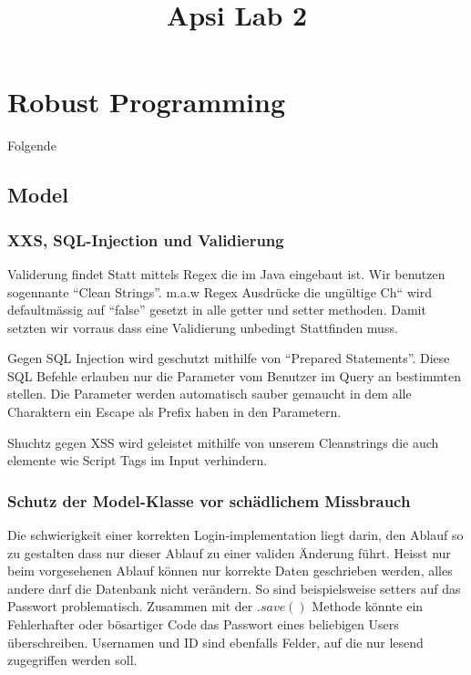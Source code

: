 \documentclass[10pt]{scrartcl}
\title{ %
Apsi
\vspace{0.2cm}
\Large Lab 2 }
\begin{document}
 \maketitle
 \thispagestyle{firststyle}
 \pagestyle{firststyle}
 \begin{abstract}
 \begin{center}

 \end{center}
 \vspace{0.5cm}
\hrulefill
\end{abstract}

 \pagestyle{documentstyle}
 \tableofcontents
 \pagebreak
\section{Robust Programming}
Folgende
\subsection{Model}
\subsubsection{XXS, SQL-Injection und Validierung}
Validerung findet Statt mittels Regex die im Java eingebaut ist. Wir benutzen sogennante ``Clean Strings''. m.a.w Regex 
Ausdrücke die ungültige Ch`` wird defaultmässig auf ``false'' gesetzt in alle getter und setter methoden. Damit 
setzten wir vorraus dass eine Validierung unbedingt Stattfinden muss. 

Gegen SQL Injection wird geschutzt mithilfe von ``Prepared Statements''. Diese SQL Befehle erlauben nur die Parameter 
vom Benutzer im Query an bestimmten stellen. Die Parameter werden automatisch sauber gemaucht in dem alle Charaktern 
ein Escape als Prefix haben in den Parametern.
 
Shuchtz gegen XSS wird geleistet mithilfe von unserem Cleanstrings die auch elemente wie Script Tags im Input 
verhindern.


\subsubsection{Schutz der Model-Klasse vor schädlichem Missbrauch}
Die schwierigkeit einer korrekten Login-implementation liegt darin, den Ablauf so zu gestalten dass nur dieser Ablauf zu einer validen Änderung führt. Heisst nur beim vorgesehenen Ablauf können nur korrekte Daten geschrieben werden, alles andere darf die Datenbank nicht verändern. So sind beispielsweise setters auf das Passwort problematisch. Zusammen mit der $.save()$ Methode könnte ein Fehlerhafter oder bösartiger Code das Passwort eines beliebigen Users überschreiben. Usernamen und ID sind ebenfalls Felder, auf die nur lesend zugegriffen werden soll.
\end{document}
